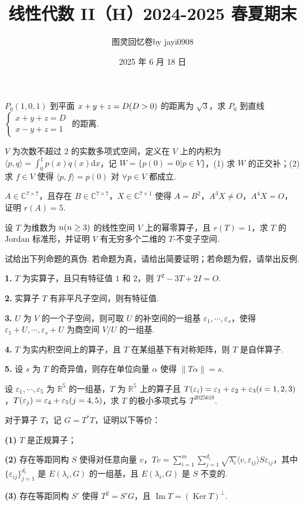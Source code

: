 \documentclass[UTF8,14pt,normal]{ctexart}
\title{\textbf{线性代数 II（H）2024-2025 春夏期末}}
\author{图灵回忆卷\quad\quad by jayi0908}
\date{2025 年 6 月 18 日}
\begin{document}
\maketitle

 $P_0(1,0,1)$ 到平面 $x+y+z=D\space(D>0)$ 的距离为 $\sqrt{3}$，求 $P_0$ 到直线 $\begin{cases}x+y+z=D \\ x-y+z=1\end{cases}$ 的距离.

 $V$ 为次数不超过 $2$ 的实数多项式空间，定义在 $V$ 上的内积为 $\langle p,q \rangle = \int_0^1 p(x)q(x)\mathrm{d}x$，记 $W=\{p(0)=0\vert p\in V\}$，(1) 求 $W$ 的正交补；(2) 求 $f\in V$ 使得 $\langle p,f \rangle = p(0)$ 对 $\forall p\in V$ 都成立.

 $A\in\mathbb{C}^{7\times 7}$，且存在 $B\in\mathbb{C}^{7\times 7}$，$X\in\mathbb{C}^{7\times 1}$ 使得 $A=B^2$，$A^3 X\neq O$，$A^4 X=O$，证明 $r(A)=5$.

 设 $T$ 为维数为 $n\space(n\ge 3)$ 的线性空间 $V$ 上的幂零算子，且 $r(T)=1$，求 $T$ 的 Jordan 标准形，并证明 $V$ 有无穷多个二维的 $T$-不变子空间. 

 试给出下列命题的真伪. 若命题为真，请给出简要证明；若命题为假，请举出反例.

\textbf{1.} $T$ 为实算子，且只有特征值 $1$ 和 $2$，则 $T^2-3T+2I=O$.

\textbf{2.} 实算子 $T$ 有非平凡子空间，则有特征值.

\textbf{3.} $U$ 为 $V$ 的一个子空间，则可取 $U$ 的补空间的一组基 $\varepsilon_1,\cdots,\varepsilon_s$，使得 $\varepsilon_1+U,\cdots,\varepsilon_s+U$ 为商空间 $V/U$ 的一组基.

\textbf{4.} $T$ 为实内积空间上的算子，且 $T$ 在某组基下有对称矩阵，则 $T$ 是自伴算子.

\textbf{5.} 设 $s$ 为 $T$ 的奇异值，则存在单位向量 $\alpha$ 使得 $\|T\alpha\|=s$.

 设 $\varepsilon_1,\cdots,\varepsilon_5$ 为 $\mathbb{R}^5$ 的一组基，$T$ 为 $\mathbb{R}^5$ 上的算子且 $T(\varepsilon_i)=\varepsilon_1+\varepsilon_2+\varepsilon_3\space(i=1,2,3)$，$T(\varepsilon_j)=\varepsilon_4+\varepsilon_5\space(j=4,5)$，求 $T$ 的极小多项式与 $T^{2025618}$.

 对于算子 $T$，记 $G=T^*T$，证明以下等价：

\textbf{(1)} $T$ 是正规算子；

\textbf{(2)} 存在等距同构 $S$ 使得对任意向量 $v$，$Tv=\displaystyle\sum_{i=1}^m\displaystyle\sum_{j=1}^{d_i}\sqrt{\lambda_i}\langle v,\varepsilon_{ij}\rangle S\varepsilon_{ij}$，其中 $\{\varepsilon_{ij}\}_{j=1}^{d_i}$ 是 $E(\lambda_i,G)$ 的一组基，且 $E(\lambda_i,G)$ 是 $S$ 不变的.

\textbf{(3)} 存在等距同构 $S'$ 使得 $T^2=S'G$，且 $\operatorname{Im} T = (\operatorname{Ker} T)^\perp$.
\end{document}
